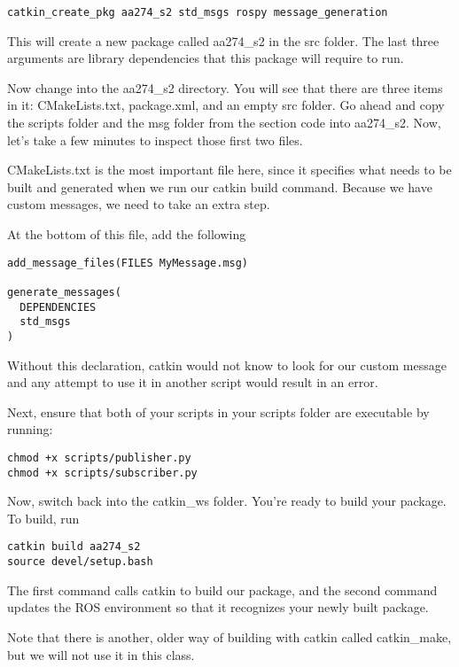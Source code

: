 \begin{lstlisting}
catkin_create_pkg aa274_s2 std_msgs rospy message_generation
\end{lstlisting}

This will create a new package called aa274\_s2 in the src folder. The last three arguments are library dependencies that this package will require to run.

Now change into the aa274\_s2 directory. You will see that there are three items in it: CMakeLists.txt, package.xml, and an empty src folder. Go ahead and copy the scripts folder and the msg folder from the section code into aa274\_s2. Now, let's take a few minutes to inspect those first two files.

CMakeLists.txt is the most important file here, since it specifies what needs to be built and generated when we run our catkin build command. Because we have custom messages, we need to take an extra step.

At the bottom of this file, add the following

\begin{lstlisting}
add_message_files(FILES MyMessage.msg)

generate_messages(
  DEPENDENCIES
  std_msgs
)
\end{lstlisting}

Without this declaration, catkin would not know to look for our custom message and any attempt to use it in another script would result in an error.

Next, ensure that both of your scripts in your scripts folder are executable by running:

\begin{lstlisting}
chmod +x scripts/publisher.py
chmod +x scripts/subscriber.py
\end{lstlisting}

Now, switch back into the catkin\_ws folder. You're ready to build your package. To build, run

\begin{lstlisting}
catkin build aa274_s2
source devel/setup.bash
\end{lstlisting}

The first command calls catkin to build our package, and the second command updates the ROS environment so that it recognizes your newly built package.

Note that there is another, older way of building with catkin called catkin\_make, but we will not use it in this class.

